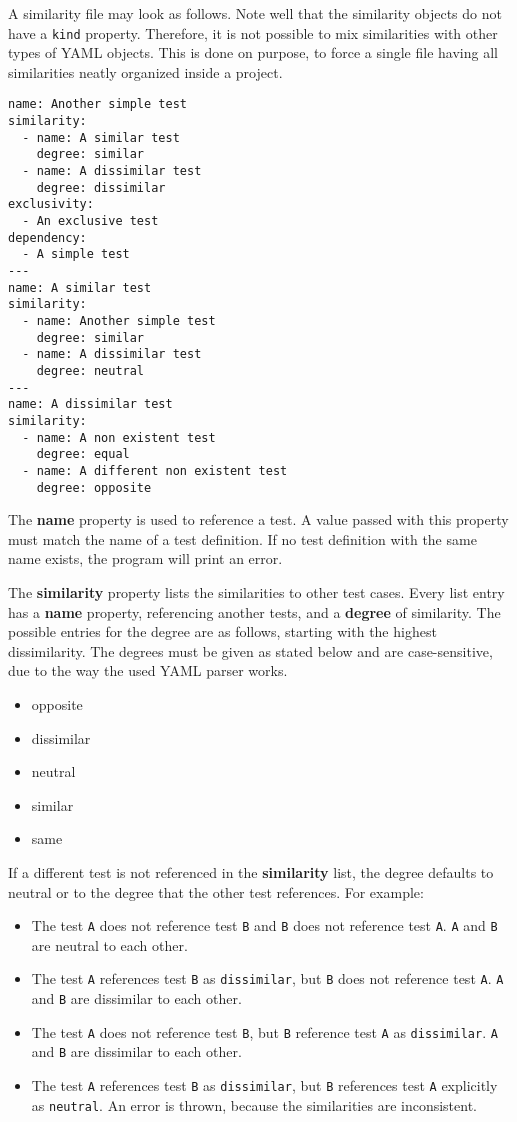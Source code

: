 A similarity file may look as follows.
Note well that the similarity objects do not have a \verb|kind| property.
Therefore, it is not possible to mix similarities with other types of YAML objects.
This is done on purpose, to force a single file having all similarities neatly organized inside a project.

\begin{verbatim}
name: Another simple test
similarity:
  - name: A similar test
    degree: similar
  - name: A dissimilar test
    degree: dissimilar
exclusivity:
  - An exclusive test
dependency:
  - A simple test
---
name: A similar test
similarity:
  - name: Another simple test
    degree: similar
  - name: A dissimilar test
    degree: neutral
---
name: A dissimilar test
similarity:
  - name: A non existent test
    degree: equal
  - name: A different non existent test
    degree: opposite
\end{verbatim}

The \textbf{name} property is used to reference a test.
A value passed with this property must match the name of a test definition.
If no test definition with the same name exists, the program will print an error.

The \textbf{similarity} property lists the similarities to other test cases.
Every list entry has a \textbf{name} property, referencing another tests, and a \textbf{degree} of similarity.
The possible entries for the degree are as follows, starting with the highest dissimilarity.
The degrees must be given as stated below and are case-sensitive, due to the way the used YAML parser works.

\begin{itemize}
  \item opposite
  \item dissimilar
  \item neutral
  \item similar
  \item same
\end{itemize}

If a different test is not referenced in the \textbf{similarity} list, the degree defaults to neutral or to the degree that the other test references.
For example:
\begin{itemize}
  \item The test \verb|A| does not reference test \verb|B| and \verb|B| does not reference test \verb|A|. \verb|A| and \verb|B| are neutral to each other.
  \item The test \verb|A| references test \verb|B| as \verb|dissimilar|, but \verb|B| does not reference test \verb|A|. \verb|A| and \verb|B| are dissimilar to each other.
  \item The test \verb|A| does not reference test \verb|B|, but \verb|B| reference test \verb|A| as \verb|dissimilar|. \verb|A| and \verb|B| are dissimilar to each other.
  \item The test \verb|A| references test \verb|B| as \verb|dissimilar|, but \verb|B| references test \verb|A| explicitly as \verb|neutral|. An error is thrown, because the similarities are inconsistent.
\end{itemize}

